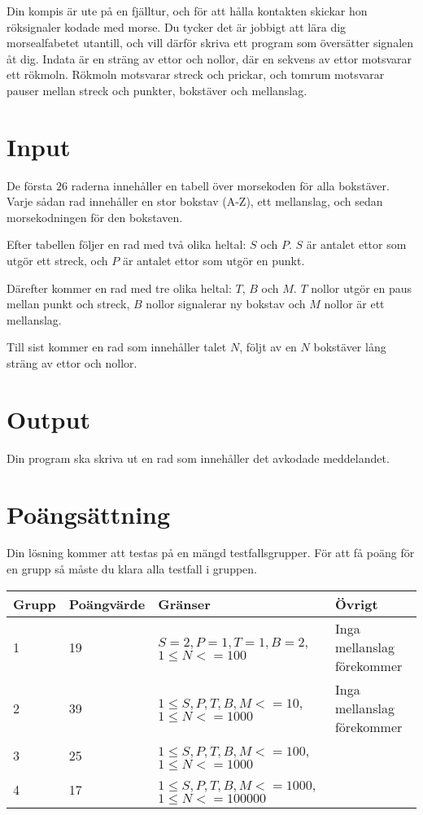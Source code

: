 
Din kompis är ute på en fjälltur, och för att hålla kontakten skickar hon röksignaler kodade med morse. Du tycker det är jobbigt att lära dig morsealfabetet utantill, och vill därför skriva ett program som översätter signalen åt dig. Indata är en sträng av ettor och nollor, där en sekvens av ettor motsvarar ett rökmoln. Rökmoln motsvarar streck och prickar, och tomrum motsvarar pauser mellan streck och punkter, bokstäver och mellanslag.

\section*{Input}
De första $26$ raderna innehåller en tabell över morsekoden för alla bokstäver.
Varje sådan rad innehåller en stor bokstav (A-Z), ett mellanslag, och sedan morsekodningen för den bokstaven.

Efter tabellen följer en rad med två olika heltal: $S$ och $P$.
$S$ är antalet ettor som utgör ett streck, och $P$ är antalet ettor som utgör en punkt.

Därefter kommer en rad med tre olika heltal: $T$, $B$ och $M$.
$T$ nollor utgör en paus mellan punkt och streck, $B$ nollor signalerar ny bokstav och $M$ nollor är ett mellanslag.

Till sist kommer en rad som innehåller talet $N$, följt av en $N$ bokstäver lång sträng av ettor och nollor.

\section*{Output}
Din program ska skriva ut en rad som innehåller det avkodade meddelandet.

\section*{Poängsättning}
Din lösning kommer att testas på en mängd testfallsgrupper. För att få poäng för en grupp
så måste du klara alla testfall i gruppen.
\begin{tabular}{| l | l | l | l |}
\hline
Grupp & Poängvärde & Gränser & Övrigt \\ \hline
1     & 19         &  $S = 2, P = 1, T = 1, B = 2$, $1 \le N <= 100$  & Inga mellanslag förekommer\\ \hline
2     & 39         &  $1 \le S, P, T, B, M <= 10$, $1 \le N <= 1000$ & Inga mellanslag förekommer \\ \hline
3     & 25         &  $1 \le S, P, T, B, M <= 100$, $1 \le N <= 1000$    & \\ \hline
4     & 17        &  $1 \le S, P, T, B, M <= 1000$, $1 \le N <= 100000$  & \\ \hline
\end{tabular}
